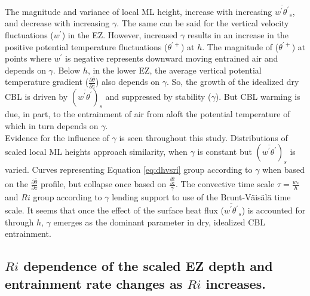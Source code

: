 The magnitude and variance of local ML height, increase with increasing $\overline{w^{'}\theta^{'}}_{s}$, and decrease with increasing $\gamma$.  The same can be said for the vertical velocity fluctuations ($w^{'}$) in the EZ.  However, increased $\gamma$ results in an increase in the positive potential temperature fluctuations ($\theta^{'+}$) at $h$. The magnitude of ($\theta^{'+}$) at points where $w^{'}$ is negative represents downward moving entrained air and depends on $\gamma$.  Below $h$, in the lower EZ, the average vertical potential temperature gradient ($\frac{\partial \overline{\theta}}{\partial z}$) also depends on $\gamma$. So, the growth of the idealized dry CBL is driven by $(\overline{w^{'}\theta^{'}})_{s}$ and suppressed by stability ($\gamma$). But CBL warming is due, in part, to the entrainment of air from aloft the potential temperature of which in turn depends on $\gamma$.\\

Evidence for the influence of $\gamma$ is seen throughout this study.  Distributions of scaled local ML heights approach similarity, when $\gamma$ is constant but $(\overline{w^{'}\theta^{'}})_{s}$ is varied.  Curves representing Equation \ref{eq:dhvsri} group according to $\gamma$ when based on the $\frac{\partial \overline{\theta}}{\partial z}$ profile, but collapse once based on $\frac{\frac{\partial \overline{\theta}}{\partial z}}{\gamma}$.  The convective time scale $\tau = \frac{w_{*}}{h}$ and $Ri$ group according to $\gamma$ lending support to \cite{FedConzMir04} use of the Brunt-V{\"a}is{\"a}l{\"a} time scale.  It seems that once the effect of the surface heat flux ($\overline{w^{'}\theta^{'}}_{s}$) is accounted for through $h$, $\gamma$ emerges as the dominant parameter in dry, idealized CBL entrainment.\\
 
\subsection{$Ri$ dependence of the scaled EZ depth and entrainment rate changes as $Ri$ increases.}

